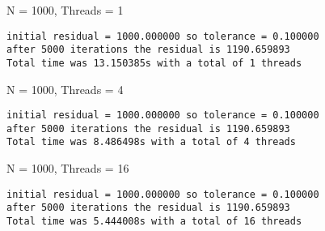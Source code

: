 \documentclass{article}
\begin{document}
N = 1000, Threads = 1
\begin{verbatim}
initial residual = 1000.000000 so tolerance = 0.100000
after 5000 iterations the residual is 1190.659893
Total time was 13.150385s with a total of 1 threads
\end{verbatim}

N = 1000, Threads = 4
\begin{verbatim}
initial residual = 1000.000000 so tolerance = 0.100000
after 5000 iterations the residual is 1190.659893
Total time was 8.486498s with a total of 4 threads
\end{verbatim}

N = 1000, Threads = 16
\begin{verbatim}
initial residual = 1000.000000 so tolerance = 0.100000
after 5000 iterations the residual is 1190.659893
Total time was 5.444008s with a total of 16 threads
\end{verbatim}
\end{document}
